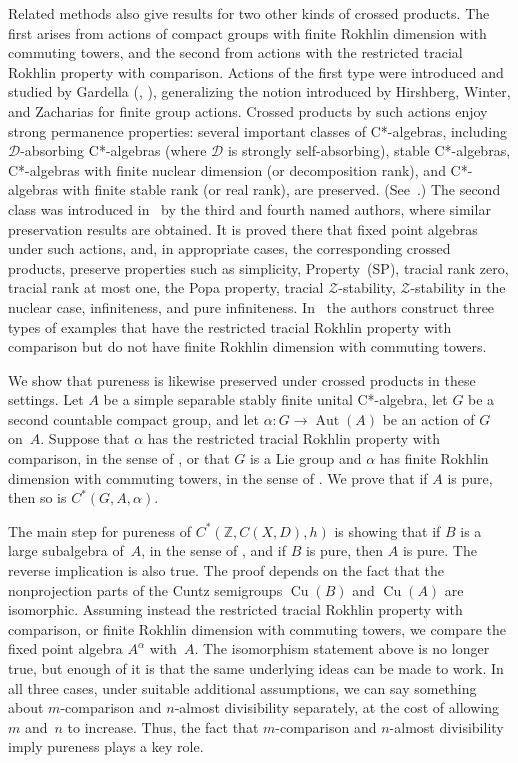 \documentclass[10pt]{amsart}
\numberwithin{equation}{section}
\theoremstyle{definition}
\newcommand{\af}{\alpha}
\newcommand{\Z}{{\mathbb{Z}}}
\newcommand{\Aut}{{\operatorname{Aut}}}
\newcommand{\Cu}{{\operatorname{Cu}}}
\newcommand{\ca}{C*-algebra}
\begin{document}
Related methods also give results for two other kinds of crossed products.
The first arises from actions of compact groups with finite Rokhlin dimension with commuting towers, and the second from actions with the restricted tracial Rokhlin property with comparison.
Actions of the first type were introduced and studied by Gardella  (\cite{Gard17}, \cite{gardella17}), generalizing the notion introduced by Hirshberg, Winter, and Zacharias for finite group actions.
Crossed products by such actions enjoy strong permanence properties:
several important classes of C*-algebras, including $\mathcal{D}$-absorbing C*-algebras (where $\mathcal{D}$ is strongly self-absorbing), stable C*-algebras, C*-algebras with finite nuclear dimension (or decomposition rank), and C*-algebras with finite stable rank (or real rank), are preserved.
(See~\cite[Theorem~4.17]{GdlHrbStg}.)
The second class was introduced in~\cite{MohPhil2021TRP} by the third and fourth named authors, where similar preservation results are obtained.
It is proved there that fixed point algebras under such actions,
and, in appropriate cases, the corresponding crossed products,
preserve properties such as simplicity, Property~(SP), tracial rank zero, tracial rank at most one, the Popa property, tracial $\mathcal{Z}$-stability, $\mathcal{Z}$-stability in the nuclear case, infiniteness, and pure infiniteness.
In~\cite{MohPhil2021TRP2} the authors construct three types of examples that have the restricted tracial Rokhlin property with comparison but do not have finite Rokhlin dimension with commuting towers.

We show that pureness is likewise preserved under crossed products in these settings.
Let $A$ be a simple separable stably finite unital \ca,
let $G$ be a second countable compact group,
and let $\af \colon G \to \Aut (A)$ be an action of $G$ on~$A$.
Suppose that $\af$ has
the restricted tracial Rokhlin property with comparison,
in the sense of \cite[Definition~2.1]{MohPhil2021TRP},
or that $G$ is a Lie group
and $\af$ has finite Rokhlin dimension with commuting towers,
in the sense of \cite[Definition~3.2]{gardella17}.
We prove that if $A$ is pure, then so is $C^* (G, A, \af)$.

The main step
for pureness of $C^* (\Z, C (X, D), h)$ is showing
that if $B$ is a large subalgebra of~$A$, in the
sense of \cite[Definition~4.1]{Phl40}, and if $B$
is pure, then $A$ is pure.
The reverse implication
is also true.
The proof depends on the fact that the
nonprojection parts of the Cuntz semigroups $\Cu (B)$ and $\Cu (A)$ are
isomorphic.
Assuming instead the restricted tracial
Rokhlin property with comparison, or finite Rokhlin
dimension with commuting towers, we compare the
fixed point algebra $A^{\af}$ with~$A$.
The
isomorphism statement above is no longer true,
but enough of it is that the same underlying ideas
can be made to work.
In all three cases, under
suitable additional assumptions, we can say
something about $m$-comparison and $n$-almost
divisibility separately, at the cost of allowing $m$
and~$n$ to increase.
Thus, the fact that
$m$-comparison and $n$-almost divisibility
imply pureness plays a key role.
\end{document}
